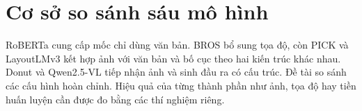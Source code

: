 \section{Cơ sở so sánh sáu mô hình}
RoBERTa cung cấp mốc chỉ dùng văn bản. BROS bổ sung tọa độ, còn PICK và LayoutLMv3 kết hợp ảnh với văn bản và bố cục theo hai kiến trúc khác nhau. Donut và Qwen2.5-VL tiếp nhận ảnh và sinh đầu ra có cấu trúc. Đề tài so sánh các cấu hình hoàn chỉnh. Hiệu quả của từng thành phần như ảnh, tọa độ hay tiền huấn luyện cần được đo bằng các thí nghiệm riêng.

